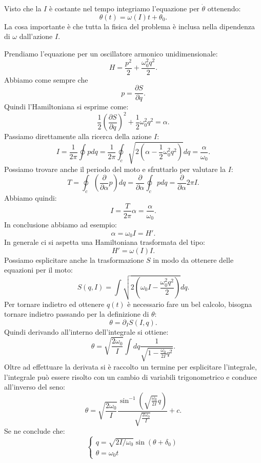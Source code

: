 \noindent
Visto che la $I$  è costante nel tempo integriamo l'equazione per $\dot{\theta}$  ottenendo:
\[
    \theta (t) = \omega (I) t + \theta_0
.\] 
La cosa importante è che tutta la fisica del problema è inclusa nella dipendenza di $\omega$  dall'azione $I$.
\begin{exmp}
    Prendiamo l'equazione per un oscillatore armonico unidimensionale:
    \[
        H = \frac{p^2}{2} + \frac{\omega^2_0 q^2}{2}
    .\] 
    Abbiamo come sempre che
    \[
        p = \frac{\partial S}{\partial q} 
    .\] 
    Quindi l'Hamiltoniana si esprime come:
    \[
        \frac{1}{2}\left(\frac{\partial S}{\partial q} \right)^2 + \frac{1}{2} \omega_0^2q^2 = \alpha
    .\] 
    Passiamo direttamente alla ricerca della azione $I$:
    \[
	I = \frac{1}{2\pi}\oint pdq = \frac{1}{2\pi}\oint _c \sqrt{2(\alpha-\frac{1}{2}\omega_0^2q^2) }dq = \frac{\alpha}{\omega_0}
    .\] 
    Possiamo trovare anche il periodo del moto e sfruttarlo per valutare la $I$:
    \[
        T = \oint _c\left(\frac{\partial }{\partial \alpha} p\right)dq = \frac{\partial }{\partial \alpha} \oint _cpdq = \frac{\partial }{\partial \alpha} 2\pi I  
    .\] 
    Abbiamo quindi:
    \[
        I = \frac{T}{2\pi}\alpha  = \frac{\alpha}{\omega_0}
    .\] 
    In conclusione abbiamo ad esempio:
    \[
        \alpha  = \omega_0I = H'
    .\] 
    In generale ci si aspetta una Hamiltoniana trasformata del tipo:
    \[
	H' = \omega (I) I
    .\] 
    Possiamo esplicitare anche la trasformazione $S$  in modo da ottenere delle equazioni per il moto:
    \[
	S(q,I) = \int\sqrt{2(\omega_0I- \frac{\omega_0^2q^2}{2})} dq
    .\] 
    Per tornare indietro ed ottenere $q(t)$ è necessario fare un bel calcolo, bisogna tornare indietro passando per la definizione di $\theta  $:
    \[
	\theta = \partial_{I}S(I,q) 
    .\] 
    Quindi derivando all'interno dell'integrale si ottiene:
    \[
	\theta  = \sqrt{\frac{2\omega_0}{I}} \int dq \frac{1}{\sqrt{1-\frac{\omega_0}{2I} q^2}}
    .\] 
    Oltre ad effettuare la derivata si è raccolto un termine per esplicitare l'integrale, l'integrale può essere risolto con un cambio di variabili trigonometrico e conduce all'inverso del seno:
    \[
	\theta  = \sqrt{\frac{2\omega_0}{I}} \frac{\sin^{-1}(\sqrt{\frac{\omega_0}{2I}} q)}{\sqrt{\frac{2\omega_0}{I}} } + c
    .\] 
    Se ne conclude che:
    \begin{equation}
        \begin{cases}
	    q = \sqrt{2I /\omega_0} \sin (\theta  + \delta_0) \\
	    \theta  = \omega_0t
        \end{cases}
	\label{eq:16_q}
    \end{equation}
\end{exmp}
\noindent
